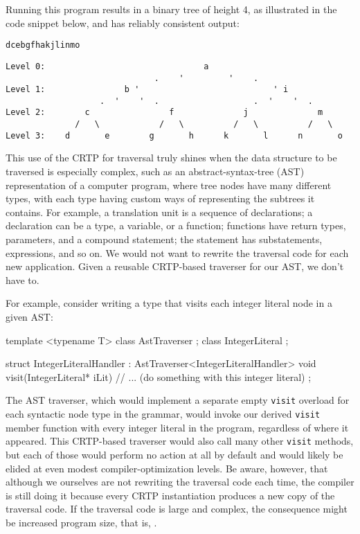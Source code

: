 \noindent Running this program results in a binary tree of height 4, as
illustrated in the code snippet below, and has reliably consistent output:

\begin{lstlisting}[style=plain]
dcebgfhakjlinmo
\end{lstlisting}
    
\begin{lstlisting}[style=plain]
Level 0:                                a
                              .    '         '    .
Level 1:                b '                           ' i
                   .  '    '  .                   .  '    '  .
Level 2:        c                f              j              m
              /   \            /   \          /   \          /   \
Level 3:    d       e        g       h      k       l      n       o
\end{lstlisting}
    
\noindent This use of the CRTP for traversal truly shines when the data structure to
be traversed is especially complex, such as an abstract-syntax-tree
(AST) representation of a computer program, where tree nodes have many
different types, with each type having custom ways of representing the
subtrees it contains. For example, a translation unit is a sequence of
declarations; a declaration can be a type, a variable, or a function;
functions have return types, parameters, and a compound statement; the
statement has substatements, expressions, and so on. We would not want
to rewrite the traversal code for each new application. Given a reusable
CRTP-based traverser for our AST, we don't have to.

For example, consider writing a type that visits each integer literal
node in a given AST:

\begin{emcppshiddenlisting}[emcppsbatch=e10]
template <typename T>
class AstTraverser {};
class IntegerLiteral {};
\end{emcppshiddenlisting}
\begin{emcppslisting}[emcppsbatch=e10]
struct IntegerLiteralHandler : AstTraverser<IntegerLiteralHandler>
{
    void visit(IntegerLiteral* iLit)
    {
        // ... (do something with this integer literal)
    }
};
\end{emcppslisting}
    
\noindent The AST traverser, which would implement a separate empty \lstinline!visit!
overload for each syntactic node type in the grammar, would invoke our
derived \lstinline!visit! member function with every integer literal in the
program, regardless of where it appeared. This CRTP-based traverser
would also call many other \lstinline!visit! methods, but each of those would perform no action at all by default and would likely be elided at even modest compiler-optimization levels. Be aware, however, that although we ourselves are
not rewriting the traversal code each time, the compiler is still doing
it because every CRTP instantiation produces a new copy of the traversal
code. If the traversal code is large and complex, the consequence might
be increased program size, that is, \emcppsgloss{code bloat}.

